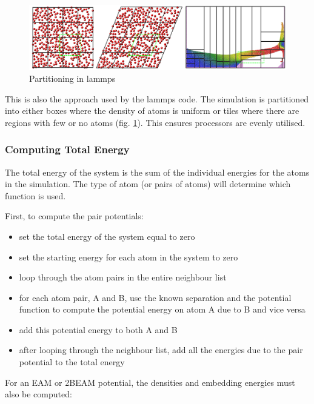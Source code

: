 \begin{figure}[!htbp]
  \begin{center}
    \includegraphics[width=.6\linewidth]{chapters/interatomic_potential_fitting/images/domain-decomp.png}
    \caption{Partitioning in \acrshort{lammps}\cite{lammpsdd}}
    \label{fig:lammpsdd}
  \end{center}
\end{figure}

This is also the approach used by the \acrshort{lammps} code.  The simulation is partitioned into either boxes where the density of atoms is uniform or tiles where there are regions with few or no atoms (fig. \ref{fig:lammpsdd}).  This ensures processors are evenly utilised.




\FloatBarrier
\subsubsection{Computing Total Energy}

The total energy of the system is the sum of the individual energies for the atoms in the simulation.  The type of atom (or pairs of atoms) will determine which function is used.

First, to compute the pair potentials:

\begin{itemize}
\item set the total energy of the system equal to zero
\item set the starting energy for each atom in the system to zero
\item loop through the atom pairs in the entire neighbour list
\item for each atom pair, A and B, use the known separation and the potential function to compute the potential energy on atom A due to B and vice versa
\item add this potential energy to both A and B
\item after looping through the neighbour list, add all the energies due to the pair potential to the total energy
\end{itemize}

For an EAM or 2BEAM potential, the densities and embedding energies must also be computed:

